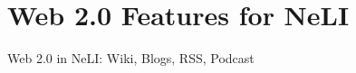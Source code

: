 \documentclass{beamer}
\begin{document}
\section{Web 2.0 Features for NeLI}
\begin{frame}[t]{Web 2.0 in NeLI: Wiki, Blogs, RSS, Podcast}
\vspace*{-0.25cm}


\end{frame}
\end{document}
